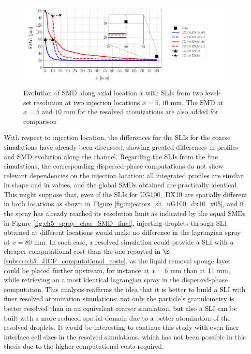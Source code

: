 \begin{figure}[h!]
\centering
\includegraphics[scale=0.5]{./part2_developments/figures_ch6_lagrangian_JICF/params_resol_and_xInj/SMD_vs_x_LS_resol_and_x_inj}
\caption[Evolution of SMD along axial location $x$ with SLIs from two level-set resolutions UG100\_DX10, UG100\_DX20 at two injection locations]{Evolution of SMD along axial location $x$ with SLIs from two level-set resolution at two injection locations $x = 5, 10$ mm. The SMD at $x = 5$ and $10$ mm for the resolved atomizations are also added for comparison}
\label{fig:SMD_vs_x_param_LS_resol_and_xinj}
\end{figure}

With respect to injection location, the differences for the SLIs for the coarse simulations have already been discussed, showing greated differences in profiles and SMD evolution along the channel. Regarding the SLIs from the fine simulations, the corresponding dispersed-phase computations do not show relevant dependencies on the injection location: all integrated profiles are similar in shape and in values, and the global SMDs obtained are practically identical. This might suppose that, even if the SLIs for UG100\_DX10 are spatially different in both locations as shown in Figure \ref{fig:injectors_sli_uG100_dx10_x05}, and if the spray has already reached its resolution limit as indicated by the equal SMDs in Figure \ref{fig:ch5_spray_char_SMD_final}, injecting droplets through SLI obtained at different locations would make no difference in the lagrangian spray at $x = 80$ mm. In such case, a resolved simulation could provide a SLI with a cheaper computational cost than the one reported in $\S$\ref{subsec:ch5_JICF_computational_costs}, as the liquid removal sponge layer could be placed further upstream, for instance at $x = 6$ mm than at 11 mm, while retrieving an almost identical lagrangian spray in the dispersed-phase computation. This analysis reaffirms the idea that it is better to build a SLI with finer resolved atomization simulations: not only the particle's granulometry is better resolved than in an equivalent coarser simulation, but also a SLI can be built with a more reduced spatial domain due to a better atomization of the resolved droplets. It would be interesting to continue this study with even finer interface cell sizes in the resolved simulations, which has not been possible in this thesis due to the higher computational costs required. 


